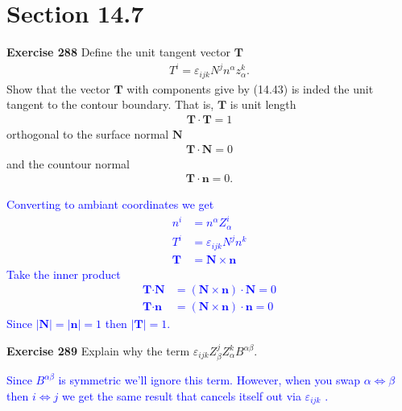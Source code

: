 \documentclass[12pt,a4paper]{report}
\newcommand{\BLUE}[1]{\textcolor{blue}{#1}}
\begin{document}
\section*{Section 14.7}
\textbf{Exercise 288}  Define the unit tangent vector $\textbf{T}$
\begin{align*}
	T^i = \varepsilon_{ijk}N^jn^\alpha z^k_\alpha.
\end{align*}
Show that the vector $\textbf{T}$ with components give by (14.43) is inded the unit tangent to the contour boundary.  That is, $\textbf{T}$ is unit length
\begin{align*}
	\textbf{T}\cdot\textbf{T} = 1
\end{align*}orthogonal to the surface normal $\textbf{N}$
\begin{align*}
	\textbf{T}\cdot\textbf{N} = 0
\end{align*}and the countour normal
\begin{align*}
	\textbf{T}\cdot\textbf{n} = 0.
\end{align*}

\BLUE{Converting to ambiant coordinates we get
\begin{align*}
	n^i &= n^\alpha Z^i_\alpha \\
	T^i &= \varepsilon_{ijk}N^jn^k \\
	\textbf{T} &= \textbf{N}\times\textbf{n}
\end{align*}Take the inner product
\begin{align*}
	\textbf{T}\cdot\textbf{N} &= (\textbf{N}\times\textbf{n})\cdot\textbf{N} = 0\\
	\textbf{T}\cdot\textbf{n} &= (\textbf{N}\times\textbf{n})\cdot\textbf{n} = 0
\end{align*}Since $|\textbf{N}| = |\textbf{n}| = 1$ then $|\textbf{T}|=1$. \\
}

 \textbf{Exercise 289} Explain why the term $\varepsilon_{ijk}Z^j_\beta Z^k_\alpha B^{\alpha\beta}$.

\BLUE{Since $B^{\alpha\beta}$ is symmetric we'll ignore this term.  However, when you swap $\alpha \iff \beta$ then $i \iff j$ we get the same result that cancels itself out via $\varepsilon_{ijk}$ .
}
\end{document}
